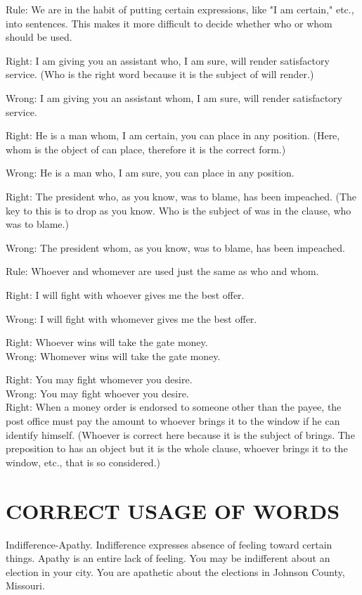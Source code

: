 \documentclass[10pt]{article}
\begin{document}
Rule: We are in the habit of putting certain expressions, like "I am certain," etc., into sentences. This makes it more difficult to decide whether who or whom should be used.

Right: I am giving you an assistant who, I am sure, will render satisfactory service. (Who is the right word because it is the subject of will render.)

Wrong: I am giving you an assistant whom, I am sure, will render satisfactory service.

Right: He is a man whom, I am certain, you can place in any position. (Here, whom is the object of can place, therefore it is the correct form.)

Wrong: He is a man who, I am sure, you can place in any position.

Right: The president who, as you know, was to blame, has been impeached. (The key to this is to drop as you know. Who is the subject of was in the clause, who was to blame.)

Wrong: The president whom, as you know, was to blame, has been impeached.

Rule: Whoever and whomever are used just the same as who and whom.

Right: I will fight with whoever gives me the best offer.

Wrong: I will fight with whomever gives me the best offer.

Right: Whoever wins will take the gate money.\\
Wrong: Whomever wins will take the gate money.

Right: You may fight whomever you desire.\\
Wrong: You may fight whoever you desire.\\
Right: When a money order is endorsed to someone other than the payee, the post office must pay the amount to whoever brings it to the window if he can identify himself. (Whoever is correct here because it is the subject of brings. The preposition to has an object but it is the whole clause, whoever brings it to the window, etc., that is so considered.)

\section*{CORRECT USAGE OF WORDS}
Indifference-Apathy. Indifference expresses absence of feeling toward certain things. Apathy is an entire lack of feeling. You may be indifferent about an election in your city. You are apathetic about the elections in Johnson County, Missouri.
\end{document}
